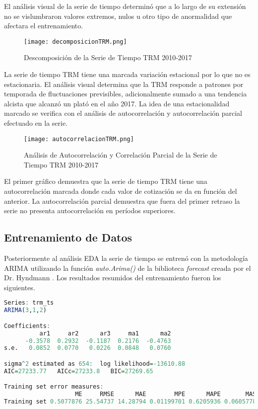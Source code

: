 El análisis visual de la serie de tiempo determinó que a lo largo de su extensión no se vislumbraron valores extremos, nulos u otro tipo de anormalidad que afectara el entrenamiento.

\begin{figure}[h!]
    \centering
    \texttt{[image: decomposicionTRM.png]}
    \caption{Descomposición de la Serie de Tiempo TRM 2010-2017}
\end{figure}

La serie de tiempo TRM tiene una marcada variación estacional por lo que no es estacionaria. El análisis visual determina que la TRM responde a patrones por temporada de fluctuaciones previsibles, adicionalmente sumado a una tendencia alcista que alcanzó un plató en el año 2017. La idea de una estacionalidad marcado se verifica con el análisis de autocorrelación y autocorrelación parcial efectuado en la serie.

\begin{figure}[H]
    \centering
    \texttt{[image: autocorrelacionTRM.png]}
    \caption{Análisis de Autocorrelación y Correlación Parcial de la Serie de Tiempo TRM 2010-2017}
\end{figure}

El primer gráfico demuestra que la serie de tiempo TRM tiene una autocorrelación marcada donde cada valor de cotización se da en función del anterior. La autocorrelación parcial demuestra que fuera del primer retraso la serie no presenta autocorrelación en períodos superiores.

\subsection{Entrenamiento de Datos}
Posteriormente al análisis EDA la serie de tiempo se entrenó con la metodología ARIMA utilizando la función \emph{auto.Arima()} de la biblioteca \emph{forecast} creada por el Dr. Hyndmann \cite{hyndman}. Los resultados resumidos del entrenamiento fueron los siguientes.

\begin{lstlisting}[language=R]
Series: trm_ts
ARIMA(3,1,2)

Coefficients:
          ar1     ar2      ar3     ma1      ma2
      -0.3578  0.2932  -0.1187  0.2176  -0.4763
s.e.   0.0852  0.0770   0.0226  0.0848   0.0760

sigma^2 estimated as 654:  log likelihood=-13610.88
AIC=27233.77   AICc=27233.8   BIC=27269.65

Training set error measures:
                    ME     RMSE      MAE        MPE      MAPE       MASE         ACF1
Training set 0.5077876 25.54737 14.28794 0.01199701 0.6205936 0.06057789 0.0001886243
\end{lstlisting}

